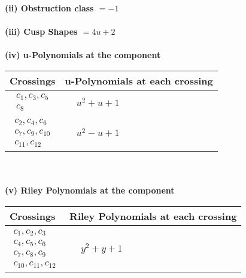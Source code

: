 \documentclass[1p]{elsarticle_modified}
\theoremstyle{definition}
\begin{document}
\flushleft \textbf{(ii) Obstruction class $= -1$}\\~\\
\flushleft \textbf{(iii) Cusp Shapes $= 4 u+2$}\\~\\
\newpage\renewcommand{\arraystretch}{1}
\flushleft \textbf{(iv) u-Polynomials at the component}\newline \\
\begin{tabular}{m{50pt}|m{274pt}}
Crossings & \hspace{64pt}u-Polynomials at each crossing \\
\hline $$\begin{aligned}c_{1},c_{3},c_{5}\\c_{8}\end{aligned}$$&$\begin{aligned}
&u^2+u+1
\end{aligned}$\\
\hline $$\begin{aligned}c_{2},c_{4},c_{6}\\c_{7},c_{9},c_{10}\\c_{11},c_{12}\end{aligned}$$&$\begin{aligned}
&u^2- u+1
\end{aligned}$\\
\hline
\end{tabular}\\~\\
\newpage\renewcommand{\arraystretch}{1}
\flushleft \textbf{(v) Riley Polynomials at the component}\newline \\
\begin{tabular}{m{50pt}|m{274pt}}
Crossings & \hspace{64pt}Riley Polynomials at each crossing \\
\hline $$\begin{aligned}c_{1},c_{2},c_{3}\\c_{4},c_{5},c_{6}\\c_{7},c_{8},c_{9}\\c_{10},c_{11},c_{12}\end{aligned}$$&$\begin{aligned}
&y^2+y+1
\end{aligned}$\\
\hline
\end{tabular}\\~\\
\end{document}
